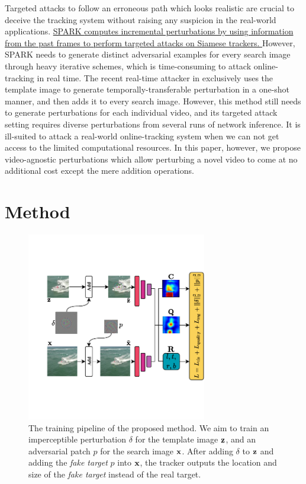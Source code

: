 \documentclass[journal]{IEEEtran}
\begin{document}
Targeted attacks to follow an erroneous path which looks realistic are crucial to deceive the tracking system without raising any suspicion in the real-world applications.
\uline{
SPARK \cite{SPARK} computes incremental perturbations by using information from the past frames to perform targeted attacks on Siamese trackers. 
}
However, SPARK needs to generate distinct adversarial examples for every search image through heavy iterative schemes, which is time-consuming to attack online-tracking in real time. The recent real-time attacker in \cite{TTP} exclusively uses the template image to generate temporally-transferable perturbation in a one-shot manner, and then adds it to every search image. However, this method still needs to generate perturbations for each individual video, and its targeted attack setting requires diverse perturbations from several runs of network inference. It is ill-suited to attack a real-world online-tracking system when we can not get access to the limited computational resources. In this paper, however, we propose video-agnostic perturbations which allow perturbing a novel video to come at no additional cost except the mere addition operations.

\section{Method}

\begin{figure}[t]
  \centering
  \includegraphics[width=0.7\textwidth]{images_imperceptible/network_v5.pdf}
  \caption{The training pipeline of the proposed method. We aim to train an imperceptible perturbation $\delta$ for the template image $\textbf z$, and an adversarial patch $p$ for the search image $\textbf x$. After adding $\delta$ to $\textbf z$ and adding the \textit{fake target} $p$ into $\textbf x$, the tracker outputs the location and size of the \textit{fake target} instead of the real target.}
  \label{fig:net}
\end{figure}
\end{document}
